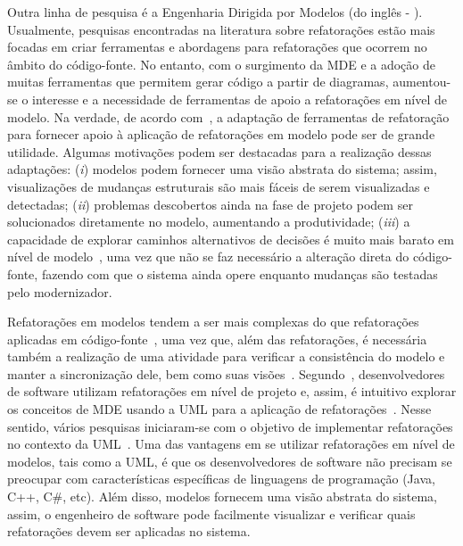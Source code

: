 Outra linha de pesquisa é a Engenharia Dirigida por Modelos (do inglês - ). 
Usualmente, pesquisas encontradas na literatura sobre refatorações estão mais focadas em criar ferramentas e abordagens para refatorações que ocorrem no âmbito do código-fonte. 
No entanto, com o surgimento da MDE e a adoção de muitas ferramentas que permitem gerar código a partir de diagramas, aumentou-se o interesse e a necessidade de ferramentas de apoio a refatorações em nível de modelo. Na verdade, de acordo com~, a adaptação de ferramentas de refatoração para fornecer apoio à aplicação de refatorações em modelo pode ser de grande utilidade. Algumas motivações podem ser destacadas para a realização dessas adaptações: (\emph{i}) modelos podem fornecer uma visão abstrata do sistema; assim, visualizações de mudanças estruturais são mais fáceis de serem visualizadas e detectadas; (\emph{ii}) problemas descobertos ainda na fase de projeto podem ser solucionados diretamente no modelo, aumentando a produtividade; (\emph{iii}) a capacidade de explorar caminhos alternativos de decisões é muito mais barato em nível de modelo~\cite{Mens_2006}, uma vez que não se faz necessário a alteração direta do código-fonte, fazendo com que o sistema ainda opere enquanto mudanças são testadas pelo modernizador.


Refatorações em modelos tendem a ser mais complexas do que refatorações aplicadas em código-fonte~\cite{Mens_2006}, uma vez que, além das refatorações, é necessária também a realização de uma atividade para verificar a consistência do modelo e manter a sincronização dele, bem como suas visões~\cite{KolahdouzRahimi20145}. Segundo~, desenvolvedores de software utilizam refatorações em nível de projeto e, assim, é intuitivo explorar os conceitos de MDE usando a UML para a aplicação de refatorações~\cite{Salem_2008, Gorp, Egyed_2008, Briand_2006, staron2004implementing}. Nesse sentido, vários pesquisas iniciaram-se com o objetivo de implementar refatorações no contexto da UML~\cite{revisao_sistematica_uml_refactoring}. Uma das vantagens em se utilizar refatorações em nível de modelos, tais como a UML, é que os desenvolvedores de software não precisam se preocupar com características específicas de linguagens de programação (Java, C++, C\#, etc). Além disso, modelos fornecem uma visão abstrata do sistema, assim, o engenheiro de software pode facilmente visualizar e verificar quais refatorações devem ser aplicadas no sistema. 

